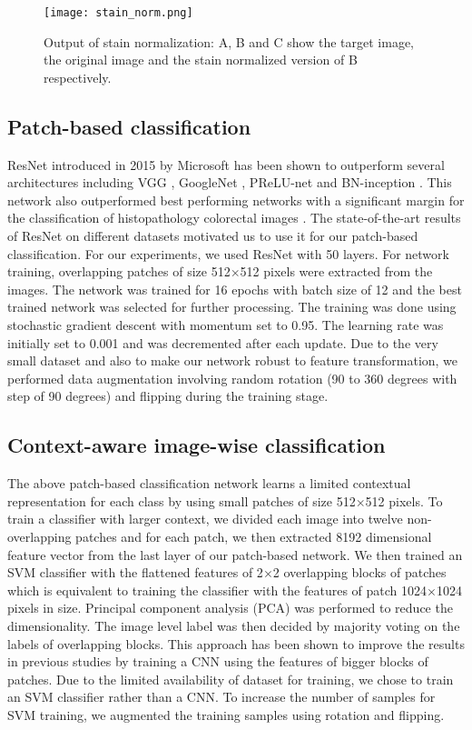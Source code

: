 \documentclass[runningheads,a4paper]{llncs}
\begin{document}
\begin{figure}[ht]
\centering
\texttt{[image: stain\_norm.png]}
\caption{Output of stain normalization: A, B and C show the target image, the original image and the stain normalized version of B respectively.}
\label{fig:example}
\end{figure}

\subsection{Patch-based classification}

ResNet \cite{he2016deep} introduced in 2015 by Microsoft has been shown to outperform several architectures including VGG \cite{simonyan2014very}, GoogleNet \cite{szegedy2015going}, PReLU-net \cite{he2015delving} and BN-inception \cite{ioffe2015batch}. This network also outperformed best performing networks with a significant margin for the classification of histopathology colorectal images \cite{korbar2017deep}. The state-of-the-art results of ResNet on different datasets motivated us to use it for our patch-based classification. For our experiments, we used ResNet with 50 layers. For network training, overlapping patches of size 512$\times$512 pixels were extracted from the images. The network was trained for 16 epochs with batch size of 12 and the best trained network was selected for further processing. The training was done using stochastic gradient descent with momentum set to 0.95. The learning rate was initially set to 0.001 and was decremented after each update. Due to the very small dataset and also to make our network robust to feature transformation, we performed data augmentation involving random rotation (90 to 360 degrees with step of 90 degrees) and flipping during the training stage.
 
\subsection{Context-aware image-wise classification}    

The above patch-based classification network learns a limited contextual representation for each class by using small patches of size 512$\times$512 pixels. To train a classifier with larger context, we divided each image into twelve non-overlapping patches and for each patch, we then extracted 8192 dimensional feature vector from the last layer of our patch-based network. We then trained an SVM classifier with the flattened features of 2$\times$2 overlapping blocks of patches which is equivalent to training the classifier with the features of patch 1024$\times$1024 pixels in size. Principal component analysis (PCA) was performed to reduce the dimensionality. The image level label was then decided by majority voting on the labels of overlapping blocks. This approach has been shown to improve the results in previous studies by training a CNN using the features of bigger blocks of patches. Due to the limited availability of dataset for training, we chose to train an SVM classifier rather than a CNN. To increase the number of samples for SVM training, we augmented the training samples using rotation and flipping.
 
\end{document}
